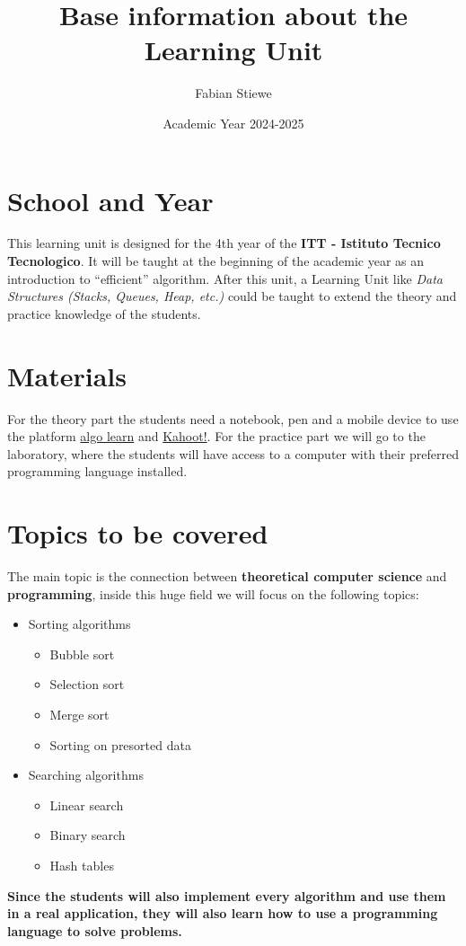 \documentclass[10pt, oneside]{article}
\title{Base information about the Learning Unit}
\author{Fabian Stiewe}
\date{Academic Year 2024-2025}
\theoremstyle{remark}
\begin{document}
\maketitle
\tableofcontents

\newpage

\section{School and Year}
This learning unit is designed for the 4th year of the \textbf{ITT - Istituto Tecnico Tecnologico}. It will be taught at the beginning of the academic year as an introduction to \enquote{efficient} algorithm. After this unit, a Learning Unit like \textit{Data Structures (Stacks, Queues, Heap, etc.)} could be taught to extend the theory and practice knowledge of the students.

\section{Materials}
For the theory part the students need a notebook, pen and a mobile device to use the platform \href{https://tcs.uni-frankfurt.de/algo-learn-testing/refs_heads_feat-bubbleSort/en}{algo learn} and \href{https://kahoot.it/}{Kahoot!}. For the practice part we will go to the laboratory, where the students will have access to a computer with their preferred programming language installed.

\section{Topics to be covered}
The main topic is the connection between \textbf{theoretical computer science} and \textbf{programming}, inside this huge field we will focus on the following topics:
\begin{itemize}
  \item Sorting algorithms
  \begin{itemize}
    \item Bubble sort
    \item Selection sort
    \item Merge sort
    \item Sorting on presorted data
  \end{itemize}    
  \item Searching algorithms
  \begin{itemize}
    \item Linear search
    \item Binary search
    \item Hash tables
  \end{itemize}
\end{itemize}
\textbf{Since the students will also implement every algorithm and use them in a real application, they will also learn how to use a programming language to solve problems.} 
\end{document}
